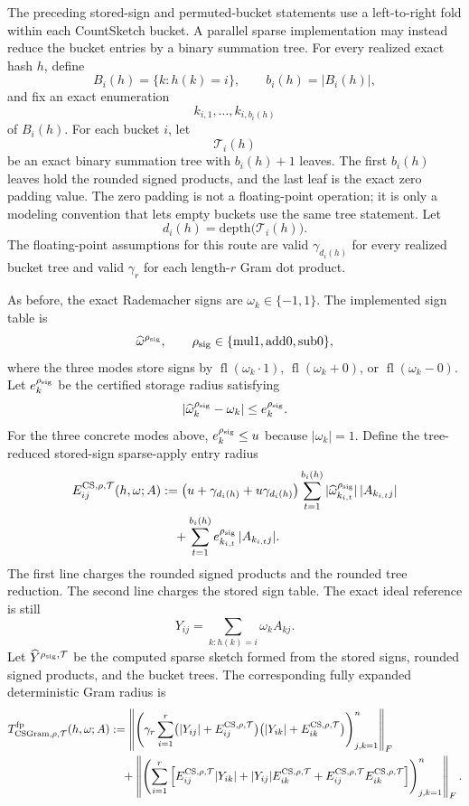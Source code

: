 \documentclass[11pt]{article}
\newcommand{\Frob}[1]{\left\lVert #1\right\rVert_F}
\newcommand{\fl}{\operatorname{fl}}
\theoremstyle{remark}
\begin{document}
The preceding stored-sign and permuted-bucket statements use a left-to-right
fold within each CountSketch bucket.  A parallel sparse implementation may
instead reduce the bucket entries by a binary summation tree.  For every
realized exact hash \(h\), define
\[
  B_i(h)=\{k:h(k)=i\},
  \qquad
  b_i(h)=|B_i(h)|,
\]
and fix an exact enumeration
\[
  k_{i,1},\ldots,k_{i,b_i(h)}
\]
of \(B_i(h)\).  For each bucket \(i\), let
\[
  \mathcal T_i(h)
\]
be an exact binary summation tree with \(b_i(h)+1\) leaves.  The first
\(b_i(h)\) leaves hold the rounded signed products, and the last leaf is the
exact zero padding value.  The zero padding is not a floating-point
operation; it is only a modeling convention that lets empty buckets use the
same tree statement.  Let
\[
  d_i(h)=\mathrm{depth}\bigl(\mathcal T_i(h)\bigr).
\]
The floating-point assumptions for this route are valid \(\gamma_{d_i(h)}\)
for every realized bucket tree and valid \(\gamma_r\) for each length-\(r\)
Gram dot product.

As before, the exact Rademacher signs are \(\omega_k\in\{-1,1\}\).  The
implemented sign table is
\[
  \widehat\omega^{\rho_{\rm sig}},
  \qquad
  \rho_{\rm sig}\in\{\mathrm{mul1},\mathrm{add0},\mathrm{sub0}\},
\]
where the three modes store signs by \(\fl(\omega_k\cdot1)\),
\(\fl(\omega_k+0)\), or \(\fl(\omega_k-0)\).  Let \(e_k^{\rho_{\rm sig}}\)
be the certified storage radius satisfying
\[
  |\widehat\omega_k^{\rho_{\rm sig}}-\omega_k|
  \le e_k^{\rho_{\rm sig}} .
\]
For the three concrete modes above, \(e_k^{\rho_{\rm sig}}\le u\) because
\(|\omega_k|=1\).  Define the tree-reduced stored-sign sparse-apply entry
radius
\[
\begin{aligned}
  E^{{\rm CS},\rho,\mathcal T}_{ij}(h,\omega;A)
  &:=
  \bigl(u+\gamma_{d_i(h)}+u\gamma_{d_i(h)}\bigr)
  \sum_{t=1}^{b_i(h)}
    |\widehat\omega^{\rho_{\rm sig}}_{k_{i,t}}|\,|A_{k_{i,t}j}|
\\
  &\quad+
  \sum_{t=1}^{b_i(h)}
    e_{k_{i,t}}^{\rho_{\rm sig}}\,|A_{k_{i,t}j}|.
\end{aligned}
\]
The first line charges the rounded signed products and the rounded tree
reduction.  The second line charges the stored sign table.  The exact ideal
reference is still
\[
  Y_{ij}=\sum_{k:h(k)=i}\omega_k A_{kj}.
\]
Let \(\widehat Y^{\rho_{\rm sig},\mathcal T}\) be the computed sparse sketch
formed from the stored signs, rounded signed products, and the bucket trees.
The corresponding fully expanded deterministic Gram radius is
\[
\begin{aligned}
  T_{{\rm CSGram},\rho,\mathcal T}^{\rm fp}(h,\omega;A)
  &:=
  \Frob{
    \left(
      \gamma_r
      \sum_{i=1}^{r}
      \bigl(|Y_{ij}|+E^{{\rm CS},\rho,\mathcal T}_{ij}\bigr)
      \bigl(|Y_{ik}|+E^{{\rm CS},\rho,\mathcal T}_{ik}\bigr)
    \right)_{j,k=1}^{n}
  }
\\
  &\quad+
  \Frob{
    \left(
      \sum_{i=1}^{r}
      \left[
        E^{{\rm CS},\rho,\mathcal T}_{ij}|Y_{ik}|
        +
        |Y_{ij}|E^{{\rm CS},\rho,\mathcal T}_{ik}
        +
        E^{{\rm CS},\rho,\mathcal T}_{ij}
          E^{{\rm CS},\rho,\mathcal T}_{ik}
      \right]
    \right)_{j,k=1}^{n}
  } .
\end{aligned}
\]
\end{document}
